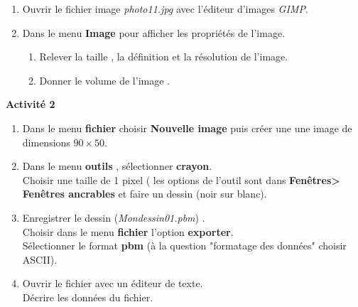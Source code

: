 \documentclass[10pt,fleqn]{article} %
\begin{document}
\begin{enumerate}
	\item Ouvrir le fichier image \textit{photo11.jpg} avec l'éditeur d'images \textit{GIMP}.
	\item Dans le menu \textbf{Image} pour afficher les propriétés de l'image.
	
	\begin{enumerate}
		\item 	Relever la taille , la définition et la résolution de l'image.
		\item Donner le volume de l'image .
		
	\end{enumerate}
\end{enumerate}

\vspace{0.4cm}


\textbf{Activité 2}








\vspace{0.2cm}


\begin{enumerate}
	\item Dans le menu \textbf{fichier} choisir \textbf{Nouvelle image} puis créer une une image de dimensions $90\times 50$.
	
	\vspace{0.2cm}
	\item Dans le menu \textbf{outils} , sélectionner  \textbf{crayon}.\\
	Choisir  une taille de 1 pixel ( les options de l'outil sont dans \textbf{Fenêtres> Fenêtres ancrables} et faire un dessin (noir sur blanc).
	
	\vspace{0.2cm}
	\item Enregistrer le dessin  (\textit{Mondessin01.pbm}) .\\
	Choisir dans le menu \textbf{fichier} l'option \textbf{exporter}.\\
	Sélectionner le format \textbf{pbm} (à la question "formatage des données" choisir ASCII).
	
	\vspace{0.2cm}
	
	
	\item Ouvrir le fichier avec un éditeur de texte.\\
	Décrire les données du fichier.
\end{enumerate}
\end{document}
